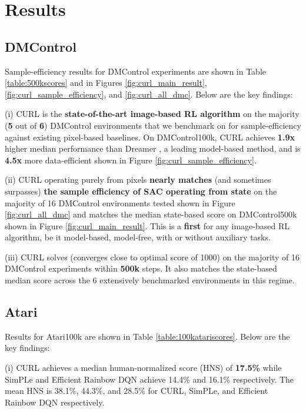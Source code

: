 \section{Results}
\subsection{DMControl} Sample-efficiency results for DMControl experiments are shown in Table \ref{table:500kscores} and in Figures \ref{fig:curl_main_result}, \ref{fig:curl_sample_efficiency}, and \ref{fig:curl_all_dmc}. Below are the key findings:

(i) CURL is the \textbf{state-of-the-art image-based RL algorithm} on the majority (\textbf{5} out of \textbf{6}) DMControl environments that we benchmark on for sample-efficiency against existing pixel-based baselines. On DMControl100k, CURL achieves {\textbf{1.9x}} higher median performance than Dreamer \cite{hafner2019dream}, a leading model-based method, and is {\textbf{4.5x}} more data-efficient shown in Figure \ref{fig:curl_sample_efficiency}.

(ii) CURL operating purely from pixels {\textbf{nearly matches} (and sometimes surpasses) \textbf{the sample efficiency of SAC operating from state}} on the majority of 16 DMControl environments tested shown in Figure \ref{fig:curl_all_dmc} and matches the median state-based score on DMControl500k shown in Figure \ref{fig:curl_main_result}. This is a {\textbf{first}} for any image-based RL algorithm, be it model-based, model-free, with or without auxiliary tasks.

(iii) CURL solves (converges close to optimal score of 1000) on the majority of 16 DMControl experiments within {\textbf{500k}} steps. It also matches the state-based median score across the 6 extensively benchmarked environments in this regime.

\subsection{Atari} 
Results for Atari100k are shown in Table \ref{table:100katariscores}. Below are the key findings:

(i) CURL achieves a median human-normalized score (HNS) of {\textbf{17.5\%}} while SimPLe and Efficient Rainbow DQN achieve 14.4\% and 16.1\% respectively. The mean HNS is 38.1\%, 44.3\%, and 28.5\% for CURL, SimPLe, and Efficient Rainbow DQN respectively. 

